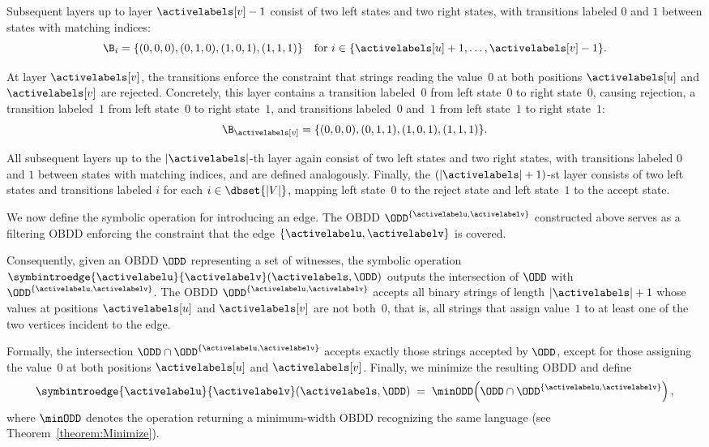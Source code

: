 Subsequent layers up to layer $\activelabels[v]-1$ consist of two left states and
two right states, with transitions labeled $0$ and $1$ between states with
matching indices:
\[
\B_i = \{(0,0,0),(0,1,0),(1,0,1),(1,1,1)\}
\quad\text{for }
i \in \{\activelabels[u]+1,\ldots,\activelabels[v]-1\}.
\]

At layer $\activelabels[v]$, the transitions enforce the constraint that strings
reading the value~$0$ at both positions $\activelabels[u]$ and
$\activelabels[v]$ are rejected. Concretely, this layer contains a transition
labeled~$0$ from left state~$0$ to right state~$0$, causing rejection, a
transition labeled~$1$ from left state~$0$ to right state~$1$, and transitions
labeled~$0$ and~$1$ from left state~$1$ to right state~$1$:
\[
\B_{\activelabels[v]}
= \{(0,0,0),(0,1,1),(1,0,1),(1,1,1)\}.
\]

All subsequent layers up to the $|\activelabels|$-th layer again consist of two
left states and two right states, with transitions labeled $0$ and $1$ between
states with matching indices, and are defined analogously. Finally, the
$(|\activelabels|+1)$-st layer consists of two left states and transitions labeled
$i$ for each $i \in \dbset{|V|}$, mapping left state~$0$ to the reject state and
left state~$1$ to the accept state.

We now define the symbolic operation for introducing an edge. The OBDD
$\ODD^{\{\activelabelu,\activelabelv\}}$ constructed above serves as a filtering
OBDD enforcing the constraint that the edge $\{\activelabelu,\activelabelv\}$ is
covered.

Consequently, given an OBDD $\ODD$ representing a set of witnesses, the symbolic
operation $\symbintroedge{\activelabelu}{\activelabelv}(\activelabels,\ODD)$
outputs the intersection of $\ODD$ with $\ODD^{\{\activelabelu,\activelabelv\}}$.
The OBDD $\ODD^{\{\activelabelu,\activelabelv\}}$ accepts all binary strings of
length $|\activelabels|+1$ whose values at positions
$\activelabels[u]$ and $\activelabels[v]$ are not both~$0$, that is, all strings
that assign value~$1$ to at least one of the two vertices incident to the edge.

Formally, the intersection $\ODD \cap \ODD^{\{\activelabelu,\activelabelv\}}$
accepts exactly those strings accepted by $\ODD$, except for those assigning the
value~$0$ at both positions $\activelabels[u]$ and $\activelabels[v]$. Finally,
we minimize the resulting OBDD and define
\[
\symbintroedge{\activelabelu}{\activelabelv}(\activelabels,\ODD)
\;=\;
\minODD\!\left(\ODD \cap \ODD^{\{\activelabelu,\activelabelv\}}\right),
\]
where $\minODD$ denotes the operation returning a minimum-width OBDD recognizing
the same language (see Theorem~\ref{theorem:Minimize}).



